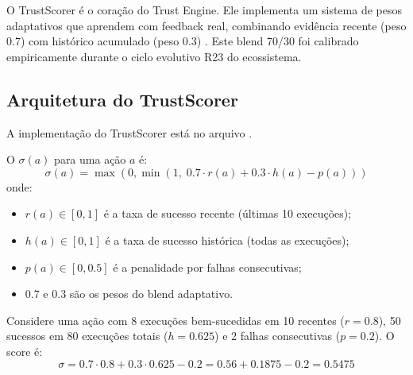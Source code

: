 O TrustScorer é o coração do Trust Engine. Ele implementa um sistema
de pesos adaptativos que aprendem com feedback real, combinando
evidência recente (peso 0.7) com histórico acumulado (peso 0.3)
\cite{opencode2026spec038}. Este blend 70/30 foi calibrado
empiricamente durante o ciclo evolutivo R23 do ecossistema.

\subsection{Arquitetura do TrustScorer}

A implementação do TrustScorer está no arquivo
.

\begin{definicao}
O  $\sigma(a)$ para uma ação $a$ é:
\[
\sigma(a) = \max\left(0, \min\left(1,\; 0.7 \cdot r(a) + 0.3 \cdot
h(a) - p(a)\right)\right)
\]
onde:
\begin{itemize}
\item $r(a) \in [0,1]$ é a taxa de sucesso recente (últimas 10
execuções);
\item $h(a) \in [0,1]$ é a taxa de sucesso histórica (todas as
execuções);
\item $p(a) \in [0, 0.5]$ é a penalidade por falhas consecutivas;
\item $0.7$ e $0.3$ são os pesos do blend adaptativo.
\end{itemize}
\end{definicao}

\begin{exemplo}
Considere uma ação com 8 execuções bem-sucedidas em 10 recentes
($r = 0.8$), 50 sucessos em 80 execuções totais ($h = 0.625$) e 2
falhas consecutivas ($p = 0.2$). O score é:
\[
\sigma = 0.7 \cdot 0.8 + 0.3 \cdot 0.625 - 0.2 = 0.56 + 0.1875 - 0.2
= 0.5475
\]
\end{exemplo}

